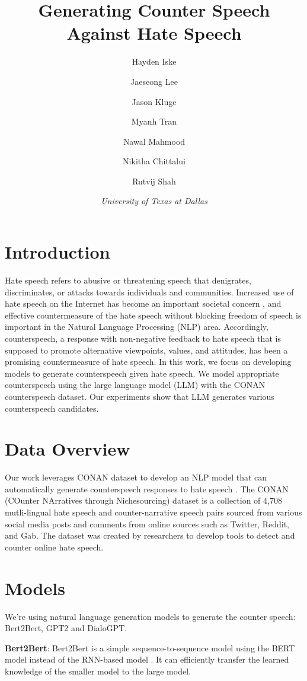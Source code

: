 \documentclass[10pt,twocolumn]{article}
\title{\textbf{Generating Counter Speech Against Hate Speech}}
\author{
    Hayden Iske \and
    Jaeseong Lee \and
    Jason Kluge \and
    Myanh Tran \and
    Nawal Mahmood \and
    Nikitha Chittalui \and
    Rutvij Shah
}
\date{
    \textit{University of Texas at Dallas}
}
\begin{document}
\maketitle

\section{Introduction}
Hate speech refers to abusive or threatening speech that denigrates, discriminates, or attacks towards individuals and communities.
Increased use of hate speech on the Internet has become an important societal concern \cite{williams2019hatred}, and effective countermeasure of the hate speech without blocking freedom of speech is important in
the Natural Language Processing (NLP) area. Accordingly, counterspeech, a response with non-negative feedback to hate
speech that is supposed to promote alternative viewpoints, values, and attitudes, has been a promising countermeasure of hate speech.
In this work, we focus on developing models to generate counterspeech given hate speech.
We model appropriate counterspeech using the large language model (LLM) with the CONAN counterspeech dataset.
Our experiments show that LLM generates various counterspeech candidates.

\section{Data Overview}
Our work leverages CONAN dataset to develop an NLP model that can automatically generate counterspeech
responses to hate speech \cite{chung-etal-2019-conan}. The CONAN (COunter NArratives through Nichesourcing) dataset
is a collection of 4,708 mutli-lingual hate speech and counter-narrative speech pairs sourced
from various social media posts and comments from online sources such as Twitter, Reddit, and Gab.
The dataset was created by researchers to develop tools to detect and counter online hate speech.


\section{Models}
We’re using natural language generation models to generate the counter speech: Bert2Bert, GPT2 and DialoGPT.

\textbf{Bert2Bert}:  Bert2Bert is a simple sequence-to-sequence model using the BERT model instead of the
RNN-based model \cite{chen2021bert2bert}. It can efficiently transfer the learned knowledge of the smaller model to the large model.
\end{document}
